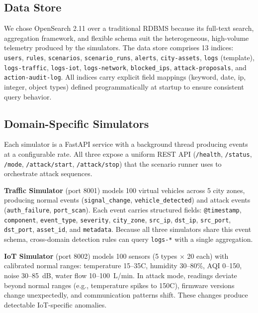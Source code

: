 \documentclass[conference,10pt]{IEEEtran}
\begin{document}
\subsection{Data Store}

We chose OpenSearch 2.11 over a traditional RDBMS because its full-text search, aggregation framework, and flexible schema suit the heterogeneous, high-volume telemetry produced by the simulators. The data store comprises 13 indices: \texttt{users}, \texttt{rules}, \texttt{scenarios}, \texttt{scenario\_runs}, \texttt{alerts}, \texttt{city-assets}, \texttt{logs} (template), \texttt{logs-traffic}, \texttt{logs-iot}, \texttt{logs-network}, \texttt{blocked\_ips}, \texttt{attack-proposals}, and \texttt{action-audit-log}. All indices carry explicit field mappings (keyword, date, ip, integer, object types) defined programmatically at startup to ensure consistent query behavior.

\subsection{Domain-Specific Simulators}

Each simulator is a FastAPI service with a background thread producing events at a configurable rate. All three expose a uniform REST API (\texttt{/health}, \texttt{/status}, \texttt{/mode}, \texttt{/attack/start}, \texttt{/attack/stop}) that the scenario runner uses to orchestrate attack sequences.

\textbf{Traffic Simulator} (port 8001) models 100 virtual vehicles across 5 city zones, producing normal events (\texttt{signal\_change}, \texttt{vehicle\_detected}) and attack events (\texttt{auth\_failure}, \texttt{port\_scan}). Each event carries structured fields: \texttt{@timestamp}, \texttt{component}, \texttt{event\_type}, \texttt{severity}, \texttt{city\_zone}, \texttt{src\_ip}, \texttt{dst\_ip}, \texttt{src\_port}, \texttt{dst\_port}, \texttt{asset\_id}, and \texttt{metadata}. Because all three simulators share this event schema, cross-domain detection rules can query \texttt{logs-*} with a single aggregation.

\textbf{IoT Simulator} (port 8002) models 100 sensors (5 types $\times$ 20 each) with calibrated normal ranges: temperature 15--35\textdegree{}C, humidity 30--80\%, AQI 0--150, noise 30--85~dB, water flow 10--100~L/min. In attack mode, readings deviate beyond normal ranges (e.g., temperature spikes to 150\textdegree{}C), firmware versions change unexpectedly, and communication patterns shift. These changes produce detectable IoT-specific anomalies.
\end{document}
